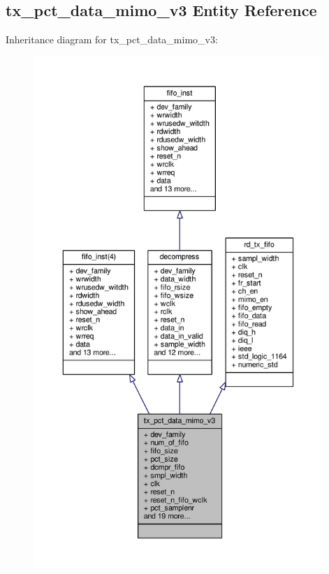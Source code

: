 \subsection{tx\+\_\+pct\+\_\+data\+\_\+mimo\+\_\+v3 Entity Reference}
\label{classtx__pct__data__mimo__v3}


Inheritance diagram for tx\+\_\+pct\+\_\+data\+\_\+mimo\+\_\+v3\+:\nopagebreak
\begin{figure}[H]
\begin{center}
\leavevmode
\includegraphics[height=550pt]{d5/dad/classtx__pct__data__mimo__v3__inherit__graph}
\end{center}
\end{figure}


